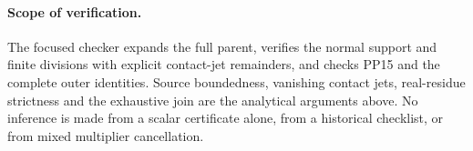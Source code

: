 \paragraph{Scope of verification.}
The focused checker expands the full parent, verifies the normal
support and finite divisions with explicit contact-jet remainders,
and checks PP15 and the complete outer identities. Source
boundedness, vanishing contact jets, real-residue strictness and
the exhaustive join are the analytical arguments above. No
inference is made from a scalar certificate alone, from a
historical checklist, or from mixed multiplier cancellation.
